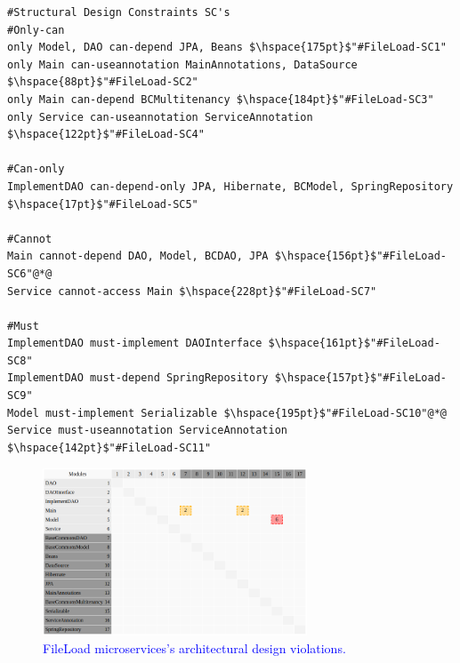 \documentclass[12pt]{article}
\begin{document}
\begin{lstlisting}[style=colorido, caption={\textcolor{blue}{FileLoad microservice's architectural design specification.}},label={list:especArquiteturalFileLoad}
]
#Structural Design Constraints SC's
#Only-can 
only Model, DAO can-depend JPA, Beans $\hspace{175pt}$"#FileLoad-SC1"
only Main can-useannotation MainAnnotations, DataSource $\hspace{88pt}$"#FileLoad-SC2"
only Main can-depend BCMultitenancy	$\hspace{184pt}$"#FileLoad-SC3"
only Service can-useannotation ServiceAnnotation $\hspace{122pt}$"#FileLoad-SC4"

#Can-only
ImplementDAO can-depend-only JPA, Hibernate, BCModel, SpringRepository $\hspace{17pt}$"#FileLoad-SC5"
	
#Cannot
Main cannot-depend DAO, Model, BCDAO, JPA $\hspace{156pt}$"#FileLoad-SC6"@*@
Service cannot-access Main $\hspace{228pt}$"#FileLoad-SC7"

#Must
ImplementDAO must-implement DAOInterface $\hspace{161pt}$"#FileLoad-SC8"
ImplementDAO must-depend SpringRepository $\hspace{157pt}$"#FileLoad-SC9"
Model must-implement Serializable $\hspace{195pt}$"#FileLoad-SC10"@*@
Service must-useannotation ServiceAnnotation $\hspace{142pt}$"#FileLoad-SC11"
\end{lstlisting}
\begin{figure}[ht]
\centering
\includegraphics[width=0.7\textwidth]{figuras/violacoesFileLoad.png}
\vspace{-0.2cm}
\caption{\textcolor{blue}{FileLoad microservices's architectural design violations.}}
\label{fig:microservices}
\end{figure}
\end{document}
